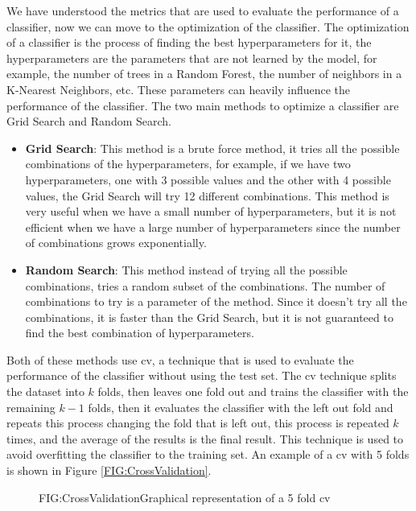 We have understood the metrics that are used to evaluate the performance of a classifier, now we can move to the optimization of the classifier. The optimization of a classifier is the process of finding the best hyperparameters for it, the hyperparameters are the parameters that are not learned by the model, for example, the number of trees in a Random Forest, the number of neighbors in a K-Nearest Neighbors, etc. These parameters can heavily influence the performance of the classifier. The two main methods to optimize a classifier are Grid Search and Random Search.

\begin{itemize}
    \item \textbf{Grid Search}: This method is a brute force method, it tries all the possible combinations of the hyperparameters, for example, if we have two hyperparameters, one with 3 possible values and the other with 4 possible values, the Grid Search will try 12 different combinations. This method is very useful when we have a small number of hyperparameters, but it is not efficient when we have a large number of hyperparameters since the number of combinations grows exponentially.
    \item \textbf{Random Search}: This method instead of trying all the possible combinations, tries a random subset of the combinations. The number of combinations to try is a parameter of the method. Since it doesn't try all the combinations, it is faster than the Grid Search, but it is not guaranteed to find the best combination of hyperparameters.
\end{itemize}


Both of these methods use \ac{cv}, a technique that is used to evaluate the performance of the classifier without using the test set. The \ac{cv} technique splits the dataset into $k$ folds, then leaves one fold out and trains the classifier with the remaining $k-1$ folds, then it evaluates the classifier with the left out fold and repeats this process changing the fold that is left out, this process is repeated $k$ times, and the average of the results is the final result. This technique is used to avoid overfitting the classifier to the training set. An example of a \ac{cv} with 5 folds is shown in Figure \ref{FIG:CrossValidation}.

\begin{figure}[Cross Validation]{FIG:CrossValidation}{Graphical representation of a 5 fold \ac{cv} \cite{noauthor_cross_2023}}
\end{figure}


